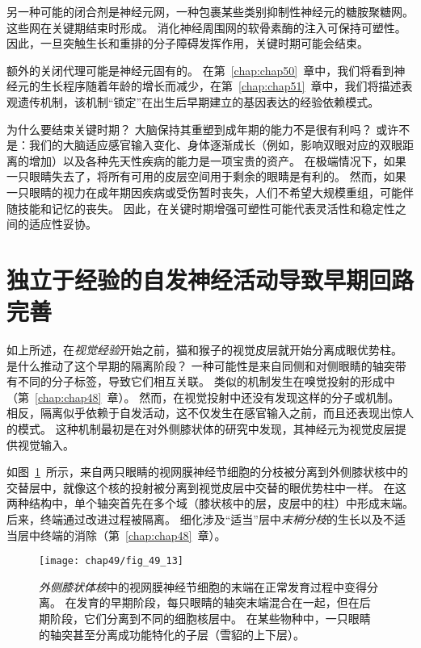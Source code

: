 另一种可能的闭合剂是神经元网，一种包裹某些类别抑制性神经元的糖胺聚糖网。
这些网在关键期结束时形成。
消化神经周围网的软骨素酶的注入可保持可塑性。
因此，一旦突触生长和重排的分子障碍发挥作用，关键时期可能会结束。


额外的关闭代理可能是神经元固有的。
在第~\ref{chap:chap50}~章中，我们将看到神经元的生长程序随着年龄的增长而减少，在第~\ref{chap:chap51}~章中，我们将描述表观遗传机制，该机制“锁定”在出生后早期建立的基因表达的经验依赖模式。


为什么要结束关键时期？
大脑保持其重塑到成年期的能力不是很有利吗？
或许不是：我们的大脑适应感官输入变化、身体逐渐成长（例如，影响双眼对应的双眼距离的增加）以及各种先天性疾病的能力是一项宝贵的资产。
在极端情况下，如果一只眼睛失去了，将所有可用的皮层空间用于剩余的眼睛是有利的。
然而，如果一只眼睛的视力在成年期因疾病或受伤暂时丧失，人们不希望大规模重组，可能伴随技能和记忆的丧失。
因此，在关键时期增强可塑性可能代表灵活性和稳定性之间的适应性妥协。



\section{独立于经验的自发神经活动导致早期回路完善}

如上所述，在\textit{视觉经验}开始之前，猫和猴子的视觉皮层就开始分离成眼优势柱。
是什么推动了这个早期的隔离阶段？
一种可能性是来自同侧和对侧眼睛的轴突带有不同的分子标签，导致它们相互关联。
类似的机制发生在嗅觉投射的形成中（第~\ref{chap:chap48}~章）。
然而，在视觉投射中还没有发现这样的分子或机制。
相反，隔离似乎依赖于自发活动，这不仅发生在感官输入之前，而且还表现出惊人的模式。
这种机制最初是在对外侧膝状体的研究中发现，其神经元为视觉皮层提供视觉输入。


如图~\ref{fig:49_13}~所示，来自两只眼睛的视网膜神经节细胞的分枝被分离到外侧膝状核中的交替层中，就像这个核的投射被分离到视觉皮层中交替的眼优势柱中一样。
在这两种结构中，单个轴突首先在多个域（膝状核中的层，皮层中的柱）中形成末端。
后来，终端通过改进过程被隔离。
细化涉及“适当”层中\textit{末梢分枝}的生长以及不适当层中终端的消除（第~\ref{chap:chap48}~章）。


\begin{figure}[htbp]
	\centering
	\texttt{[image: chap49/fig\_49\_13]}
	\caption{\textit{外侧膝状体核}中的视网膜神经节细胞的末端在正常发育过程中变得分离。
		在发育的早期阶段，每只眼睛的轴突末端混合在一起，但在后期阶段，它们分离到不同的细胞核层中。
		在某些物种中，一只眼睛的轴突甚至分离成功能特化的子层（雪貂的上下层）\cite{sanes1999formation}。}
	\label{fig:49_13}
\end{figure}


